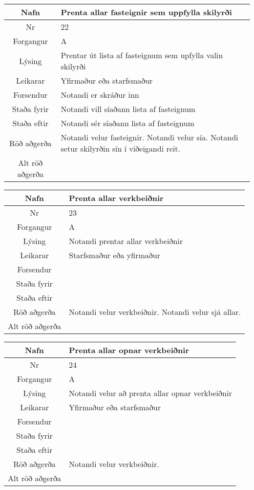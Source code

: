 \begin{table}[h!]\centering
\begin{tabular}{|c|p{10cm}|}
\hline
Nafn&Prenta allar fasteignir sem uppfylla skilyrði\\
\hline
Nr&22\\
\hline
Forgangur&A\\
\hline
Lýsing&Prentar út lista af fasteignum sem upfylla valin skilyrði\\
\hline
Leikarar&Yfirmaður eða starfsmaður\\
\hline
Forsendur&Notandi er skráður inn\\
\hline
Staða fyrir&Notandi vill síaðann lista af fasteignum\\
\hline
Staða eftir&Notandi sér síaðann lista af fasteignum\\
\hline
Röð aðgerða&Notandi velur fasteignir. Notandi velur sía. Notandi setur skilyrðin sín í viðeigandi reit. \\
\hline
Alt röð aðgerða&\\
\hline
\end{tabular}
\end{table}
\caption{Use case 22}\label{tab:use_case_22}
\begin{table}[h!]\centering
\begin{tabular}{|c|p{10cm}|}
\hline
Nafn&Prenta allar verkbeiðnir\\
\hline
Nr&23\\
\hline
Forgangur&A\\
\hline
Lýsing&Notandi prentar allar verkbeiðnir\\
\hline
Leikarar&Starfsmaður eða yfirmaður\\
\hline
Forsendur&\\
\hline
Staða fyrir&\\
\hline
Staða eftir&\\
\hline
Röð aðgerða&Notandi velur verkbeiðnir. Notandi velur sjá allar.\\
\hline
Alt röð aðgerða&\\
\hline
\end{tabular}
\end{table}
\caption{Use case 23}\label{tab:use_case_23}
\begin{table}[h!]\centering
\begin{tabular}{|c|p{10cm}|}
\hline
Nafn&Prenta allar opnar verkbeiðnir\\
\hline
Nr&24\\
\hline
Forgangur&A\\
\hline
Lýsing&Notandi velur að prenta allar opnar verkbeiðnir\\
\hline
Leikarar&Yfirmaður eða starfsmaður\\
\hline
Forsendur&\\
\hline
Staða fyrir&\\
\hline
Staða eftir&\\
\hline
Röð aðgerða&Notandi velur verkbeiðnir.\\
\hline
Alt röð aðgerða&\\
\hline
\end{tabular}
\end{table}
